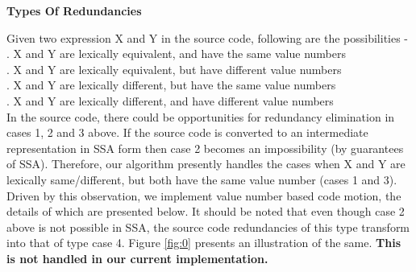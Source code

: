 \documentclass[10pt,twoside]{report}
\begin{document}
\begin{flushleft}
\textbf{\large{Types Of Redundancies}}
\end{flushleft}
Given two expression X and Y in the source code, following are the possibilities - \\
. X and Y are lexically equivalent, and have the same value numbers \\
. X and Y are lexically equivalent, but have different value numbers \\
. X and Y are lexically different, but have the same value numbers \\
. X and Y are lexically different, and have different value numbers \\
In the source code, there could be opportunities for redundancy elimination in
cases 1, 2 and 3 above. If the source code is converted to an intermediate
representation in SSA form then case 2 becomes an impossibility (by guarantees of SSA). Therefore,
               our algorithm presently handles the cases when X and Y are
               lexically same/different, but both have the same value number (cases 1 and 3).
               Driven by this observation, we implement value number based code
               motion, the details of which are presented below. It should be
               noted that even though case 2 above is not possible in SSA,
               the source code redundancies  of this type transform into that
               of type case 4. Figure \ref{fig:0} presents an illustration of the same. \textbf{This is not handled
               in our current implementation.} 
\end{document}
